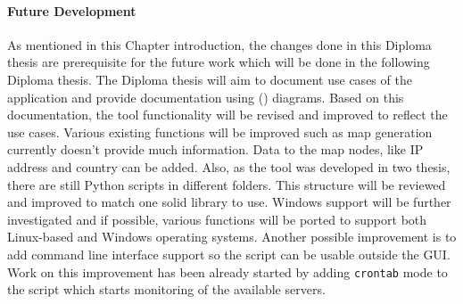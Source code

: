 \paragraph{Future Development}
As mentioned in this Chapter introduction, the changes done in this Diploma thesis are prerequisite for the future work which will be done in the following Diploma thesis. The Diploma thesis will aim to document use cases of the application and provide documentation using  () diagrams. Based on this documentation, the tool functionality  will be revised and improved to reflect the use cases. Various existing functions will be improved such as map generation currently doesn't provide much information. Data to the map nodes, like IP address and country can be added. Also, as the tool was developed in two thesis, there are still Python scripts in different folders. This structure will be reviewed and improved to match one solid library to use. Windows support will be further investigated and if possible, various functions will be ported to support both Linux-based and Windows operating systems. Another possible improvement is to add command line interface support so the script can be usable outside the GUI. Work on this improvement has been already started by adding \texttt{crontab} mode to the script which starts monitoring of the available servers. 